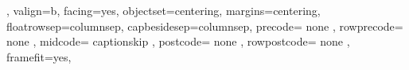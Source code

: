 {{{      %
   },%
   valign=b, %
   facing=yes, %
   objectset=centering,    %
   margins=centering,   %
    floatrowsep=columnsep, 
   capbesidesep=columnsep, 
   precode={
      none %
   },%
   rowprecode={
      none %
   },%
   midcode={%
      captionskip
   },%
   postcode={%
      none %
   },%
   rowpostcode={%
      none %
   },%
   framefit=yes, %
}}
